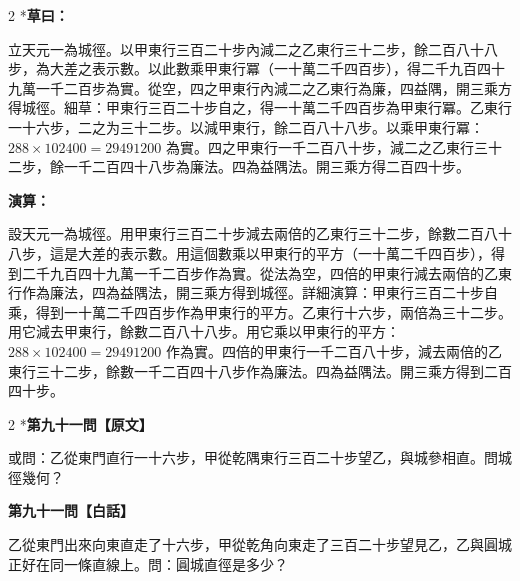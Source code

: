 \documentclass[11pt,a4paper]{article}
\begin{document}
\begin{paracol}{2}
\switchcolumn[0]*\textbf{草曰：}

\small 立天元一為城徑。以甲東行三百二十步內減二之乙東行三十二步，餘二百八十八步，為大差之表示數。以此數乘甲東行冪（一十萬二千四百步），得二千九百四十九萬一千二百步為實。從空，四之甲東行內減二之乙東行為廉，四益隅，開三乘方得城徑。細草：甲東行三百二十步自之，得一十萬二千四百步為甲東行冪。乙東行一十六步，二之为三十二步。以減甲東行，餘二百八十八步。以乘甲東行冪：$288 \times 102400 = 29491200$ 為實。四之甲東行一千二百八十步，減二之乙東行三十二步，餘一千二百四十八步為廉法。四為益隅法。開三乘方得二百四十步。

\switchcolumn\textbf{演算：}

\small 設天元一為城徑。用甲東行三百二十步減去兩倍的乙東行三十二步，餘數二百八十八步，這是大差的表示數。用這個數乘以甲東行的平方（一十萬二千四百步），得到二千九百四十九萬一千二百步作為實。從法為空，四倍的甲東行減去兩倍的乙東行作為廉法，四為益隅法，開三乘方得到城徑。詳細演算：甲東行三百二十步自乘，得到一十萬二千四百步作為甲東行的平方。乙東行十六步，兩倍為三十二步。用它減去甲東行，餘數二百八十八步。用它乘以甲東行的平方：$288 \times 102400 = 29491200$ 作為實。四倍的甲東行一千二百八十步，減去兩倍的乙東行三十二步，餘數一千二百四十八步作為廉法。四為益隅法。開三乘方得到二百四十步。
\end{paracol}

\vspace{0.1cm}
\noindent{}
\par\vspace{0.3cm}

\begin{paracol}{2}
\switchcolumn[0]*\noindent\textbf{第九十一問【原文】}

\small 或問：乙從東門直行一十六步，甲從乾隅東行三百二十步望乙，與城參相直。問城徑幾何？

\switchcolumn\noindent\textbf{第九十一問【白話】}

\small 乙從東門出來向東直走了十六步，甲從乾角向東走了三百二十步望見乙，乙與圓城正好在同一條直線上。問：圓城直徑是多少？
\end{paracol}

\vspace{0.1cm}
\noindent{}
\par\vspace{0.15cm}
\end{document}
